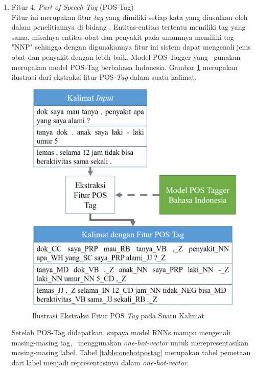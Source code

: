 \begin{enumerate}
	\item Fitur 4: \textit{Part of Speech Tag} (POS-Tag)\\
	Fitur ini merupakan fitur \textit{tag} yang dimiliki setiap kata yang diusulkan oleh \cite{abacha2011medical} dalam penelitiannya di bidang \mer. Entitas-entitas tertentu memiliki tag yang sama, misalnya entitas obat dan penyakit pada umumnya memiliki tag "NNP" sehingga dengan digunakannya fitur ini sistem dapat mengenali jenis obat dan penyakit dengan lebih baik. Model POS-Tagger yang \saya~gunakan merupakan model POS-Tag berbahasa Indonesia. Gambar \ref{fig:fiturpostag} merupakan ilustrasi dari ekstraksi fitur POS-\textit{Tag} dalam suatu kalimat.
	
	\begin{figure}
		\centering
		\includegraphics[width=0.70\linewidth]{images/fiturpostag}
		\caption{Ilustrasi Ekstraksi Fitur POS \textit{Tag} pada Suatu Kalimat}
		\label{fig:fiturpostag}
	\end{figure}

	Setelah POS-Tag didapatkan, supaya model RNNs mampu mengenali masing-masing tag, \saya~menggunakan \textit{one-hot-vector} untuk merepresentasikan masing-masing label. Tabel \ref{table:onehotpostag} merupakan tabel pemetaan dari label menjadi representasinya dalam \textit{one-hot-vector}.
	

\end{enumerate}
